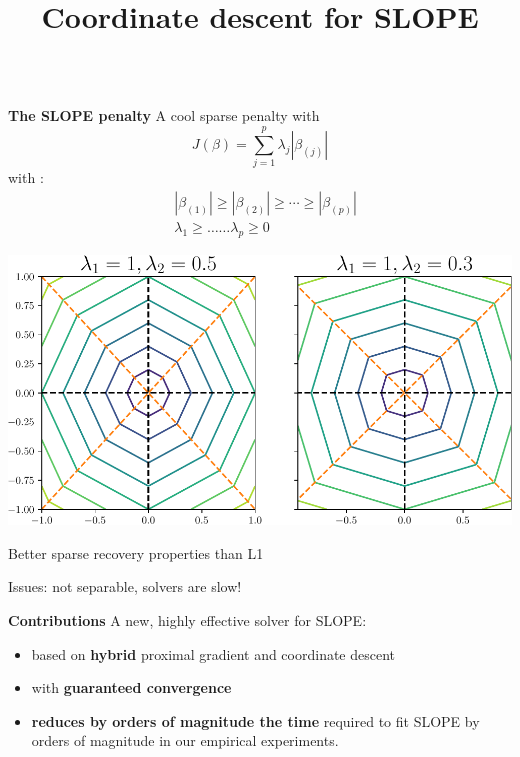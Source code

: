 \documentclass[english,final,t]{beamer}
\title{
	Coordinate descent for SLOPE}
\author{%
\texorpdfstring{
	\begin{minipage}{.98\linewidth}
	\begin{columns}%
		\column{.24\linewidth}
		\centering
		\Large Johan Larsson \\
		\large Lund University, Sweden \\[2em]
		\Large Mathurin Massias \\
		\large Univ. Lyon, Inria, CNRS, ENS de Lyon
		\column{.24\linewidth}
		\centering
		\Large Quentin Klopfenstein \\
		\large Université du Luxembourg \\[2em]
		\centering
		\Large Jonas Wallin \\
		\large Lund University, Sweden
	\end{columns}
	\vspace{1em}
\end{minipage}}{}
}
\begin{document}
\begin{frame}{}
\begin{columns}[t]
	\begin{column}{.3\linewidth}
		\begin{block}{\textbf{\color{malgared} The SLOPE penalty}}
			\justifying
			A cool sparse penalty with \textbf{\color{malgared}{built-in coefficients clustering}}
	\begin{equation*}
		J(\beta) = \sum_{j=1}^p \lambda_j|\beta_{(j)}|
    \end{equation*}
    with :
\begin{align*}
  &|\beta_{(1)}| \geq |\beta_{(2)}| \geq \cdots \geq |\beta_{(p)}|  \\
  &\lambda_1 \geq \ldots \ldots \lambda_p \geq 0
\end{align*}

\begin{center}
	\includegraphics[width=0.8\linewidth]{./images/slope
	}
\end{center}

Better sparse recovery properties than L1

Issues: not separable, solvers are slow!

	\end{block}
	\begin{block}{\textbf{\color{malgared} Contributions}}
			A new, highly effective solver for SLOPE:
			\vspace{1em}
			\begin{itemize}
				\item  based on \textbf{\color{malgared}hybrid} proximal gradient and coordinate descent
				\item  with \textbf{\color{malgared}guaranteed convergence}
				\item  \textbf{\color{malgared}reduces by orders of magnitude the time}
				required to fit SLOPE by orders of magnitude in our empirical experiments.
			\end{itemize}
	\end{block}


\end{column}
\end{columns}
\end{frame}
\end{document}
